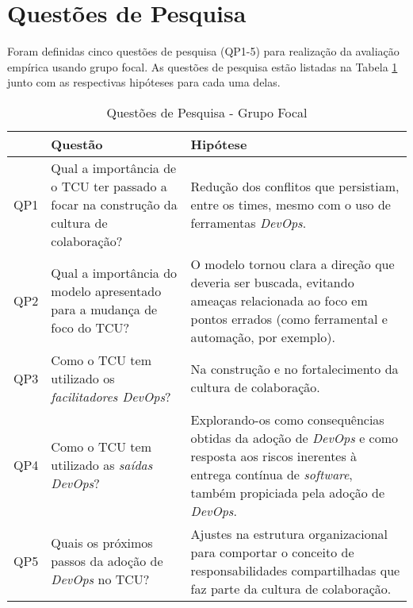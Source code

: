 \section{Questões de Pesquisa}
Foram definidas cinco questões de pesquisa (QP1-5) para realização da avaliação
empírica usando grupo focal. As questões de pesquisa estão listadas na Tabela
\ref{tabela_qp} junto com as respectivas hipóteses para cada uma delas.

\begin{table}[hb!]
\centering
\caption{Questões de Pesquisa - Grupo Focal}
\label{tabela_qp}
\begin{tabular}{|p{}|p{7cm}|p{7cm}|} \hline
    & \textbf{Questão}                                                                                    & \textbf{Hipótese}                                                                                                                                                                                                             \\
\hline
QP1 & Qual a importância de o \acrshort{TCU} ter passado a focar na construção da cultura de colaboração? & Redução dos conflitos que persistiam, entre os times, mesmo com o uso de ferramentas \textit{DevOps}. \\
\hline
QP2 & Qual a importância do modelo apresentado para a mudança de foco do \acrshort{TCU}?                  & O modelo tornou clara a direção que deveria ser buscada, evitando ameaças relacionada ao foco em pontos errados (como ferramental e automação, por exemplo). \\
\hline
QP3 & Como o \acrshort{TCU} tem utilizado os \emph{facilitadores DevOps}?                                 & Na construção e no fortalecimento da cultura de colaboração. \\
\hline
QP4 & Como o \acrshort{TCU} tem utilizado as \emph{saídas DevOps}?                                        & Explorando-os como consequências obtidas da adoção de \textit{DevOps} e como resposta aos riscos inerentes à entrega contínua de \textit{software}, também propiciada pela adoção de \textit{DevOps}. \\
\hline
QP5 & Quais os próximos passos da adoção de \textit{DevOps} no \acrshort{TCU}?                            & Ajustes na estrutura organizacional para comportar o conceito de responsabilidades compartilhadas que faz parte da cultura de colaboração. \\
\hline
\end{tabular}
\end{table}

